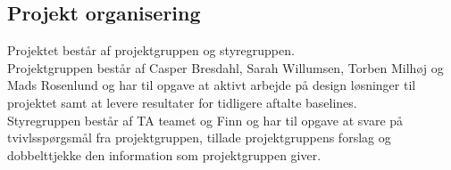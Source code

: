 \subsection{Projekt organisering}
Projektet består af projektgruppen og styregruppen.\\
Projektgruppen består af Casper Bresdahl, Sarah Willumsen, Torben Milhøj og Mads Rosenlund og har til opgave at aktivt arbejde på design løsninger til projektet samt at levere resultater for tidligere aftalte baselines.\\
Styregruppen består af TA teamet og Finn og har til opgave at svare på tvivlsspørgsmål fra projektgruppen, tillade projektgruppens forslag og dobbelttjekke den information som projektgruppen giver.